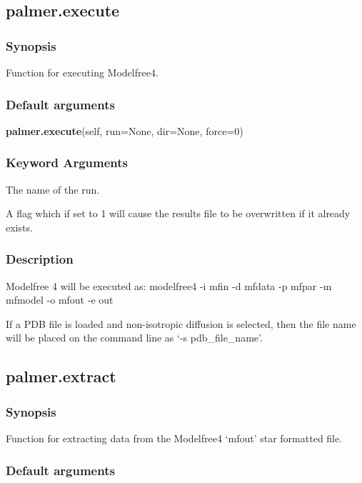 \newpage

\subsection{palmer.execute}


\subsubsection{Synopsis}

Function for executing Modelfree4.

\subsubsection{Default arguments}

\textsf{\textbf{palmer.execute}(self, run=None, dir=None, force=0)}


\subsubsection{Keyword Arguments}

  The name of the run.

  A flag which if set to 1 will cause the results file to be overwritten if it already exists.

\subsubsection{Description}

Modelfree 4 will be executed as:
    modelfree4 -i mfin -d mfdata -p mfpar -m mfmodel -o mfout -e out

If a PDB file is loaded and non-isotropic diffusion is selected, then the file name will be
placed on the command line as `-s pdb\_file\_name'.


\newpage

\subsection{palmer.extract}


\subsubsection{Synopsis}

Function for extracting data from the Modelfree4 `mfout' star formatted file.

\subsubsection{Default arguments}

